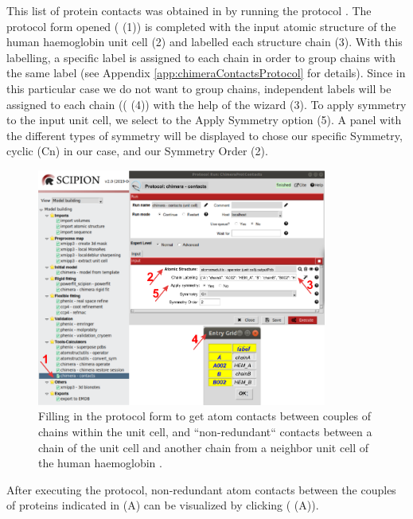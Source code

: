 \begin{itemize}
This list of protein contacts was obtained in \scipion by running the protocol . The protocol form opened ( (1)) is completed with the input atomic structure of the human haemoglobin  unit cell (2) and labelled each structure chain (3). With this labelling, a specific label is assigned to each chain in order to group chains with the same label (see Appendix \ref{app:chimeraContactsProtocol} for details). Since in this particular case we do not want to group chains, independent labels will be assigned to each chain (( (4)) with the help of the wizard (3). To apply symmetry to the input unit cell, we select  to the Apply Symmetry option (5). A panel with the different types of symmetry will be displayed to chose our specific Symmetry, cyclic (Cn) in our case, and our Symmetry Order (2). 

        \begin{figure}[H]
            \centering 
            \captionsetup{width=.7\linewidth} 
            \includegraphics[width=0.85\textwidth]{Images/Fig50}
            \caption{Filling in the  protocol form to get atom contacts between couples of chains within the unit cell, and ``non-redundant`` contacts between a chain of the unit cell and another chain from a neighbor unit cell of the human haemoglobin .}
            \label{fig:contacts_unit cell}
        \end{figure}
  
 After executing the protocol, non-redundant atom contacts between the couples of proteins indicated in  (A) can be visualized by clicking  ( (A)).
 

\end{itemize}
